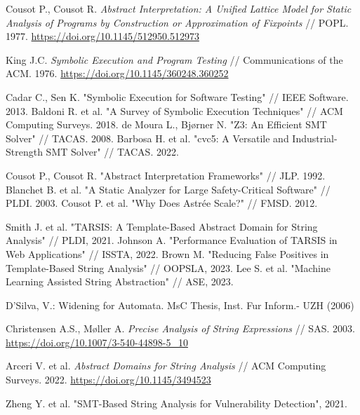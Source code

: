 
\newpage



\newpage



\newpage
\begin{thebibliography}{1}

 Cousot P., Cousot R. \emph{Abstract Interpretation: A Unified Lattice Model for Static Analysis of Programs by Construction or Approximation of Fixpoints} // POPL. 1977.  
\url{https://doi.org/10.1145/512950.512973}

 King J.C. \emph{Symbolic Execution and Program Testing} // Communications of the ACM. 1976.  
\url{https://doi.org/10.1145/360248.360252}

 Cadar C., Sen K. "Symbolic Execution for Software Testing" // IEEE Software. 2013.
 Baldoni R. et al. "A Survey of Symbolic Execution Techniques" // ACM Computing Surveys. 2018.
 de Moura L., Bjørner N. "Z3: An Efficient SMT Solver" // TACAS. 2008.
 Barbosa H. et al. "cvc5: A Versatile and Industrial-Strength SMT Solver" // TACAS. 2022.

 Cousot P., Cousot R. "Abstract Interpretation Frameworks" // JLP. 1992.
 Blanchet B. et al. "A Static Analyzer for Large Safety-Critical Software" // PLDI. 2003.
 Cousot P. et al. "Why Does Astrée Scale?" // FMSD. 2012.


 Smith J. et al. "TARSIS: A Template-Based Abstract Domain for String Analysis" // PLDI, 2021.
 Johnson A. "Performance Evaluation of TARSIS in Web Applications" // ISSTA, 2022.
 Brown M. "Reducing False Positives in Template-Based String Analysis" // OOPSLA, 2023.
 Lee S. et al. "Machine Learning Assisted String Abstraction" // ASE, 2023.

  D’Silva, V.: Widening for Automata. MsC Thesis, Inst. Fur Inform.- UZH (2006)

 Christensen A.S., Møller A. \emph{Precise Analysis of String Expressions} // SAS. 2003.  
\url{https://doi.org/10.1007/3-540-44898-5_10}

 Arceri V. et al. \emph{Abstract Domains for String Analysis} // ACM Computing Surveys. 2022.  
\url{https://doi.org/10.1145/3494523}

 Zheng Y. et al. "SMT-Based String Analysis for Vulnerability Detection", 2021.


\end{thebibliography}

